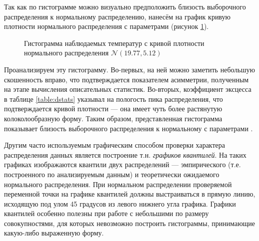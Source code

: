 Так как по гистограмме можно визуально предположить близость выборочного распределения к нормальному распределению, нанесём на график кривую плотности нормального распределения с параметрами \normaldistr (рисунок \ref{img:histogram_fitted}).
\begin{figure}[ht]
\caption{Гистограмма наблюдаемых температур с кривой плотности нормального распределения $\mathcal{N}(19.77, 5.12)$}
\label{img:histogram_fitted}
\end{figure}
Проанализируем эту гистограмму. Во-первых, на ней можно заметить небольшую скошенность вправо, что подтверждается показателем асимметрии, полученным на этапе вычисления описательных статистик. Во-вторых, коэффициент эксцесса в таблице \ref{table:dstats} указывал на пологость пика распределения, что подтверждается кривой плотности --- она имеет чуть более растянутую колоколообразную форму. Таким образом, представленная гистограмма показывает близость выборочного распределения к нормальному с параметрами \normaldistr.

Другим часто используемым графическим способом проверки характера распределения данных является построение т.н. \textit{графиков квантилей}. На таких графиках изображаются квантили двух распределений --- эмпирического (т.е. построенного по анализируемым данным) и теоретически ожидаемого нормального распределения. При нормальном распределении проверяемой переменной точки на графике квантилей должны выстраиваться в прямую линию, исходящую под улом 45 градусов из левого нижнего угла графика. Графики квантилей особенно полезны при работе с небольшими по размеру совокупностями, для которых невозможно построить гистограммы, принимающие какую-либо выраженную форму.

